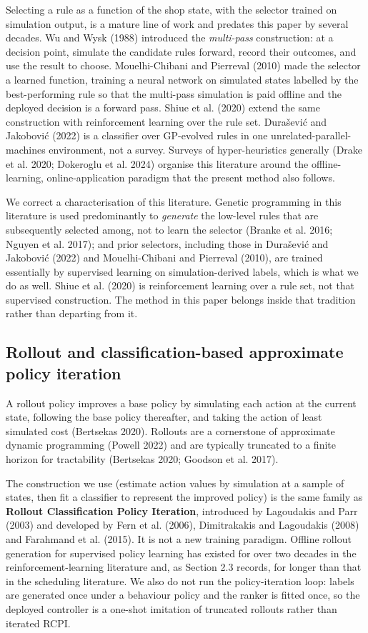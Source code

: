 \documentclass[review,3p,times]{elsarticle}
\theoremstyle{definition}
\begin{document}
Selecting a rule as a function of the shop state, with the selector
trained on simulation output, is a mature line of work and predates this
paper by several decades. Wu and Wysk (1988) introduced the
\emph{multi-pass} construction: at a decision point, simulate the
candidate rules forward, record their outcomes, and use the result to
choose. Mouelhi-Chibani and Pierreval (2010) made the selector a learned
function, training a neural network on simulated states labelled by the
best-performing rule so that the multi-pass simulation is paid offline
and the deployed decision is a forward pass. Shiue et al. (2020) extend
the same construction with reinforcement learning over the rule set.
Durašević and Jakobović (2022) is a classifier over GP-evolved rules in
one unrelated-parallel-machines environment, not a survey. Surveys of
hyper-heuristics generally (Drake et al. 2020; Dokeroglu et al. 2024)
organise this literature around the offline-learning, online-application
paradigm that the present method also follows.

We correct a characterisation of this literature. Genetic programming in
this literature is used predominantly to \emph{generate} the low-level
rules that are subsequently selected among, not to learn the selector
(Branke et al. 2016; Nguyen et al. 2017); and prior selectors, including
those in Durašević and Jakobović (2022) and Mouelhi-Chibani and
Pierreval (2010), are trained essentially by supervised learning on
simulation-derived labels, which is what we do as well. Shiue et al.
(2020) is reinforcement learning over a rule set, not that supervised
construction. The method in this paper belongs inside that tradition
rather than departing from it.

\subsection{Rollout and classification-based approximate policy
iteration}\label{rollout-and-classification-based-approximate-policy-iteration}

A rollout policy improves a base policy by simulating each action at the
current state, following the base policy thereafter, and taking the
action of least simulated cost (Bertsekas 2020). Rollouts are a
cornerstone of approximate dynamic programming (Powell 2022) and are
typically truncated to a finite horizon for tractability (Bertsekas
2020; Goodson et al. 2017).

The construction we use (estimate action values by simulation at a
sample of states, then fit a classifier to represent the improved
policy) is the same family as \textbf{Rollout Classification Policy
Iteration}, introduced by Lagoudakis and Parr (2003) and developed by
Fern et al. (2006), Dimitrakakis and Lagoudakis (2008) and Farahmand et
al. (2015). It is not a new training paradigm. Offline rollout
generation for supervised policy learning has existed for over two
decades in the reinforcement-learning literature and, as Section 2.3
records, for longer than that in the scheduling literature. We also do
not run the policy-iteration loop: labels are generated once under a
behaviour policy and the ranker is fitted once, so the deployed
controller is a one-shot imitation of truncated rollouts rather than
iterated RCPI.
\end{document}
